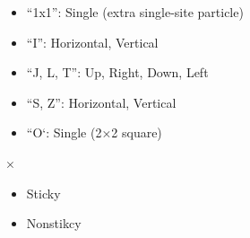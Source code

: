 \documentclass[9pt,table,xcolor=dvipsnames]{beamer}
\begin{document}
\begin{frame}
  \begin{minipage}{0.65\textwidth}
    \begin{itemize}
      \item ``1x1'': Single (extra single-site particle)
      \item ``I'': Horizontal, Vertical
      \item ``J, L, T'': Up, Right, Down, Left
      \item ``S, Z'': Horizontal, Vertical
      \item ``O`: Single (2×2 square)
    \end{itemize}
  \end{minipage}
  $\times$
  \begin{minipage}{0.30\textwidth}
    \begin{itemize}
      \item Sticky
      \item Nonstikcy
    \end{itemize}
  \end{minipage}

\end{frame}
\end{document}
